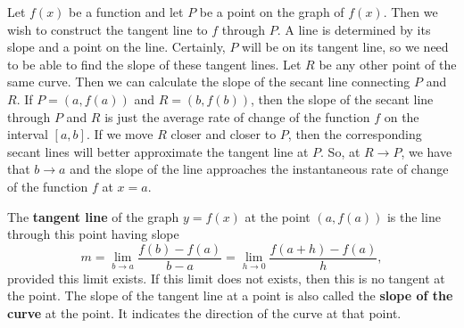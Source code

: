 \documentclass{book}
\begin{document}
Let $f(x)$ be a function and let $P$ be a point on the graph of $f(x)$. Then we wish to construct the tangent line to $f$ through $P$. A line is determined by its slope and  a point on the line. Certainly, $P$ will be on its tangent line, so we need to be able to find the slope of these tangent lines. Let $R$ be any other point of the same curve. Then we can calculate the slope of the secant line connecting $P$ and $R$. If $P = (a,f(a))$ and $R = (b,f(b))$, then the slope of the secant line through $P$ and $R$ is just the average rate of change of the function $f$ on the interval $[a,b]$. If we move $R$ closer and closer to $P$, then the corresponding secant lines will better approximate the tangent line at $P$. So, at $R\to P$, we have that $b\to a$ and the slope of the line approaches the instantaneous rate of change of the function $f$ at $x=a$. 

\begin{Def} The \textbf{tangent line} of the graph $y=f(x)$ at the point $(a,f(a))$ is the line through this point having slope
\[m = \lim_{b\to a} \dfrac{f(b)-f(a)}{b-a} = \lim_{h\to 0} \dfrac{f(a+h) - f(a)}{h},\] provided this limit exists. If this limit does not exists, then this is no tangent at the point. The slope of the tangent line at a  point is also called the \textbf{slope of the curve} at the point. It indicates the direction of the curve at that point.
\end{Def}\vs
\end{document}
